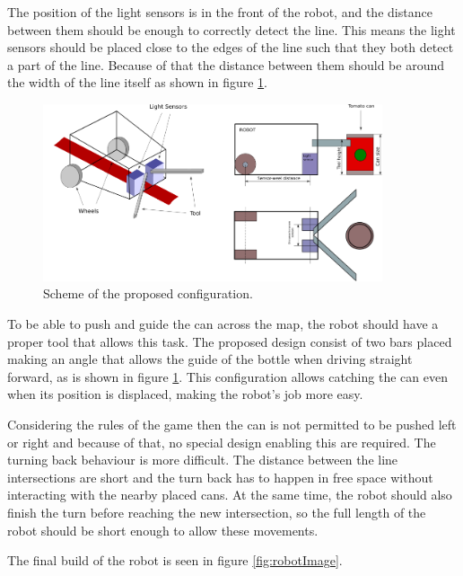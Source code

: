 \documentclass[12pt,a4paper]{article}
\begin{document}
The position of the light sensors is in the front of the robot, and the distance between them should be enough to correctly detect the line. 
This means the light sensors should be placed close to the edges of the line such that they both detect a part of the line.
Because of that the distance between them should be around the width of the line itself as shown in figure \ref{fig:robotscheme}.

\begin{figure}[H]
\includegraphics[width=10cm]{Fig2.png}
\centering
\caption{Scheme of the proposed configuration.}
\label{fig:robotscheme}
\end{figure}


To be able to push and guide the can across the map, the robot should have a proper tool that allows this task. 
The proposed design consist of two bars placed making an angle that allows the guide of the bottle when driving straight forward, as is shown in figure \ref{fig:robotscheme}.
This configuration allows catching the can even when its position is displaced, making the robot's job more easy.

Considering the rules of the game then the can is not permitted to be pushed left or right and because of that, no special design enabling this are required. 
The turning back behaviour is more difficult. 
The distance between the line intersections are short and the turn back has to happen in free space without interacting with the nearby placed cans.
At the same time, the robot should also finish the turn before reaching the new intersection, so the full length of the robot should be short enough to allow these movements.


The final build of the robot is seen in figure \ref{fig:robotImage}.
\end{document}
